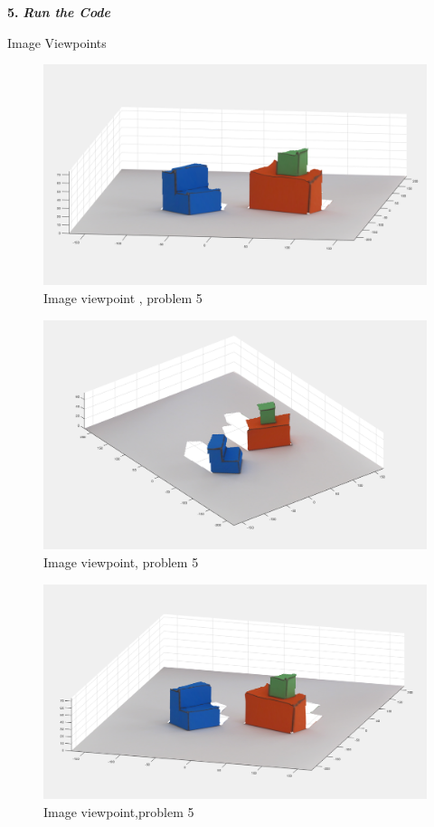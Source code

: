\documentclass[a4paper,12pt]{article}
\begin{document}
\newline \textbf{5.} \emph{\textbf{Run the Code}}

\newline Image Viewpoints

\begin{figure}
  \includegraphics[width=\linewidth]{img2fig3.jpg}
  \caption{Image viewpoint , problem 5}
  \label{fig:Image viewpoint 1}
\end{figure}
\begin{figure}
  \includegraphics[width=\linewidth]{img2fig.jpg}
  \caption{Image viewpoint, problem 5}
  \label{fig:Image viewpoint 1}
\end{figure}
\begin{figure}
  \includegraphics[width=\linewidth]{img2fig2.jpg}
  \caption{Image viewpoint,problem 5}
  \label{fig:Image viewpoint 1}
\end{figure}
\end{document}
